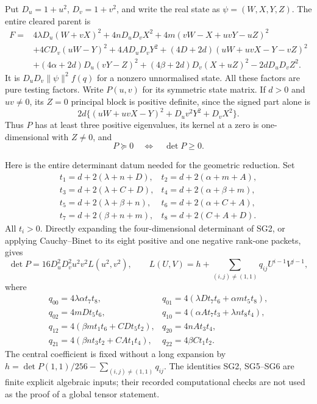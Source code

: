 Put $D_u=1+u^2$, $D_v=1+v^2$, and write the real state as
$\psi=(W,X,Y,Z)$.  The entire cleared parent is
\[
\begin{split}
 F={}&4\lambda D_u(W+vX)^2+4nD_uD_vX^2
       +4m(vW-X+uvY-uZ)^2\\
 &+4CD_v(uW-Y)^2+4AD_uD_vY^2
 +(4D+2d)(uW+uvX-Y-vZ)^2\\
 &+(4\alpha+2d)D_u(vY-Z)^2
 +(4\beta+2d)D_v(X+uZ)^2-2dD_uD_vZ^2.
\end{split}                                                   \tag{SG2}
\]
It is $D_uD_v\|\psi\|^2f(q)$ for a nonzero unnormalised state.
All these factors are pure testing factors.  Write $P(u,v)$ for its
symmetric state matrix.  If $d>0$ and $uv\ne0$, its $Z=0$ principal
block is positive definite, since the signed part alone is
\[
 2d\{(uW+uvX-Y)^2+D_uv^2Y^2+D_vX^2\}.                 \tag{SG3}
\]
Thus $P$ has at least three positive eigenvalues, its kernel at a
zero is one-dimensional with $Z\ne0$, and
\[
                 P\succeq0\quad\Longleftrightarrow\quad\det P\geq0.
                                                               \tag{SG4}
\]

Here is the entire determinant datum needed for the geometric
reduction.  Set
\[
\begin{array}{ll}
t_1=d+2(\lambda+n+D),&t_2=d+2(\alpha+m+A),\\
t_3=d+2(\lambda+C+D),&t_4=d+2(\alpha+\beta+m),\\
t_5=d+2(\lambda+\beta+n),&t_6=d+2(\alpha+C+A),\\
t_7=d+2(\beta+n+m),&t_8=d+2(C+A+D).
\end{array}
\]
All $t_i>0$.  Directly expanding the four-dimensional determinant of
SG2, or applying Cauchy--Binet to its eight positive and one negative
rank-one packets, gives
\[
 \det P=16D_u^2D_v^2u^2v^2L(u^2,v^2),\qquad
 L(U,V)=h+\sum_{(i,j)\ne(1,1)}q_{ij}U^{i-1}V^{j-1},       \tag{SG5}
\]
where
\[
\begin{array}{ll}
q_{00}=4\lambda\alpha t_7t_8,&
q_{01}=4(\lambda Dt_7t_6+\alpha mt_5t_8),\\
q_{02}=4mDt_5t_6,&
q_{10}=4(\alpha At_7t_3+\lambda nt_8t_4),\\
q_{12}=4(\beta mt_1t_6+CDt_5t_2),&
q_{20}=4nAt_3t_4,\\
q_{21}=4(\beta nt_3t_2+CAt_1t_4),&
q_{22}=4\beta Ct_1t_2.
\end{array}                                                   \tag{SG6}
\]
The central coefficient is fixed without a long expansion by
$h=\det P(1,1)/256-\sum_{(i,j)\ne(1,1)}q_{ij}$.
The identities SG2, SG5--SG6 are finite explicit algebraic inputs;
their recorded computational checks are not used as the proof of a
global tensor statement.

